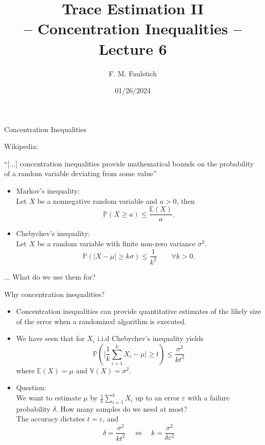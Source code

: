\documentclass{beamer}
\title{
Trace Estimation II\\
-- Concentration Inequalities -- \\
Lecture 6
}
\author{F. M. Faulstich}
\date{01/26/2024}
\newcommand{\bitem}{\item[$\bullet$]}
\begin{document}
\frame{\titlepage}

\begin{frame}{Concentration Inequalities}

Wikipedia: \\
\begin{center}
``[...] concentration inequalities provide mathematical bounds on the probability of a random variable deviating from some value''
\end{center}
\pause 
\begin{itemize}
    \bitem Markov's inequality:\\
Let $X$ be a nonnegative random variable and $a>0$, then
$$
\mathbb{P} (X\geq a)\leq {\frac {\mathbb{E} (X)}{a}}.
$$
\bitem Chebychev's inequality:\\
Let $X$ be a random variable with finite non-zero variance $\sigma^2$. 
$$
\mathbb{P}(|X-\mu |\geq k\sigma )\leq {\frac {1}{k^{2}}}\qquad \forall k >0.
$$
\end{itemize}
\pause
\begin{center}
... What do we use them for?
\end{center}
\end{frame}

\begin{frame}{Why concentration inequalities?}

\begin{itemize}
    \bitem Concentration inequalities can provide quantitative estimates of the likely size of the error when a randomized algorithm is executed. 
    \pause
    \bitem We have seen that for $X_i$ i.i.d Chebychev's inequality yields
    $$
    \mathbb{P}
    \left(
    \bigg|\frac{1}{k}\sum_{i=1}^k X_i - \mu \bigg| \geq t
    \right)
    \leq
    \frac{\sigma^2}{kt^2}
    $$
    where $\mathbb{E}(X) = \mu$ and $\mathbb{V}(X)=\sigma^2$.
    \pause
    \bitem Question:\\ 
    We want to estimate $\mu$ by $\frac{1}{k}\sum_{i=1}^k X_i$ up to an error $\varepsilon$ with a failure probability $\delta$. How many samples do we need at most?\\
    \pause
    The accuracy dictates $t = \varepsilon$, and 
    $$
    \delta = \frac{\sigma^2}{kt^2}
    \quad \Leftrightarrow \quad 
    k = \frac{\sigma^2}{\delta \varepsilon^2}
    $$
\end{itemize}
    
\end{frame}
\end{document}
